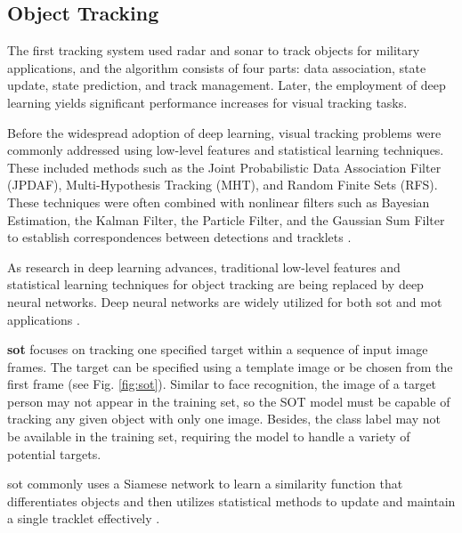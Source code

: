 
\subsection{Object Tracking}

The first tracking system used radar and sonar to track objects for military applications, and the algorithm consists of four parts: data association, state update, state prediction, and track management. Later, the employment of deep learning yields significant performance increases for visual tracking tasks.

Before the widespread adoption of deep learning, visual tracking problems were commonly addressed using low-level features and statistical learning techniques. These included methods such as the Joint Probabilistic Data Association Filter (JPDAF), Multi-Hypothesis Tracking (MHT), and Random Finite Sets (RFS). These techniques were often combined with nonlinear filters such as Bayesian Estimation, the Kalman Filter, the Particle Filter, and the Gaussian Sum Filter to establish correspondences between detections and tracklets \citep{vo2015multitarget}. 

As research in deep learning advances, traditional low-level features and statistical learning techniques for object tracking are being replaced by deep neural networks. Deep neural networks are widely utilized for both \acrfull{sot} and \acrfull{mot} applications \citep{krebs2017survey}.

\textbf{\acrfull{sot}} focuses on tracking one specified target within a sequence of input image frames. The target can be specified using a template image or be chosen from the first frame \citep{soleimanitaleb2022single} (see Fig. \ref{fig:sot}). Similar to face recognition, the image of a target person may not appear in the training set, so the SOT model must be capable of tracking any given object with only one image. Besides, the class label may not be available in the training set, requiring the model to handle a variety of potential targets.

\acrshort{sot} commonly uses a Siamese network to learn a similarity function that differentiates objects and then utilizes statistical methods to update and maintain a single tracklet effectively \citep{he2018twofold, guo2017learning, bertinetto2016fully, dong2018triplet, zhang2019deeper}.

